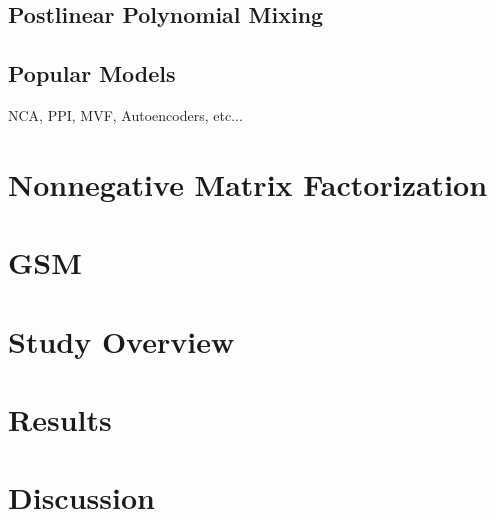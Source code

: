 \subsection{Postlinear Polynomial Mixing}
\subsection{Popular Models}
NCA, PPI, MVF, Autoencoders, etc...

\section{Nonnegative Matrix Factorization}

\section{GSM}

\section{Study Overview}

\section{Results}

\section{Discussion}

